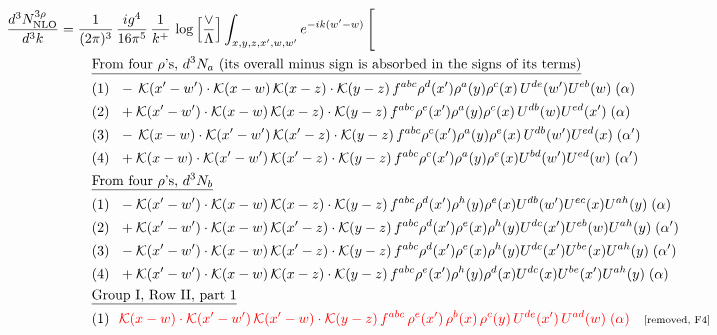 \documentclass[9pt]{article}
\begin{document}
\begin{align}
\frac{d^{3}N^{3\rho}_{\rm NLO}}{d^{3}k}={}&\frac{1}{(2\pi)^{3}}\,\frac{ig^{4}}{16\pi^{5}}\,\frac{1}{k^{+}}\,\log\Big[\frac{\vee}{\Lambda}\Big]\int_{x,y,z,x',w,w'}e^{-ik(w'-w)}\,\Bigg[\notag\\
&\quad\underline{\text{From four $\rho$'s, $d^3N_a$ (its overall minus sign is absorbed in the signs of its terms)}}\notag\\
&\quad\text{(1)}\ \ -\,\mathcal{K}(x'-w')\cdot \mathcal{K}(x-w)\, \mathcal{K}(x-z)\cdot \mathcal{K}(y-z)\, f^{a b c} \rho^{d}(x') \rho^{a}(y) \rho^{c}(x)\,U^{d e}(w') U^{e b}(w)\;(\alpha)\notag\\
&\quad\text{(2)}\ \ +\mathcal{K}(x'-w')\cdot \mathcal{K}(x-w)\, \mathcal{K}(x-z)\cdot \mathcal{K}(y-z)\, f^{a b c} \rho^{e}(x') \rho^{a}(y) \rho^{c}(x)\, U^{d b}(w) U^{e d}(x')\;(\alpha)\notag\\
&\quad\text{(3)}\ \ -\,\mathcal{K}(x-w)\cdot \mathcal{K}(x'-w')\, \mathcal{K}(x'-z)\cdot \mathcal{K}(y-z)\, f^{a b c} \rho^{c}(x') \rho^{a}(y) \rho^{e}(x)\,U^{d b}(w') U^{e d}(x)\;(\alpha')\notag\\
&\quad\text{(4)}\ \ +\mathcal{K}(x-w)\cdot \mathcal{K}(x'-w')\, \mathcal{K}(x'-z)\cdot \mathcal{K}(y-z)\, f^{a b c} \rho^{c}(x') \rho^{a}(y) \rho^{e}(x) U^{b d}(w') U^{e d}(w)\;(\alpha')\notag\\
&\quad\underline{\text{From four $\rho$'s, $d^3N_b$}}\notag\\
&\quad\text{(1)}\ \ - \mathcal{K}(x'-w')\cdot \mathcal{K}(x-w)\, \mathcal{K}(x-z)\cdot \mathcal{K}(y-z)\, f^{a b c} \rho^{d}(x') \rho^{h}(y) \rho^{e}(x) U^{d b}(w') U^{e c}(x) U^{a h}(y)\;(\alpha)\notag\\
&\quad\text{(2)}\ \ + \mathcal{K}(x'-w')\cdot \mathcal{K}(x-w)\,\mathcal{K}(x'-z)\cdot \mathcal{K}(y-z)\, f^{a b c} \rho^{d}(x') \rho^{e}(x) \rho^{h}(y) U^{d c}(x') U^{e b}(w) U^{a h}(y)\;(\alpha')\notag\\
&\quad\text{(3)}\ \ - \mathcal{K}(x'-w')\cdot \mathcal{K}(x-w)\,\mathcal{K}(x'-z)\cdot \mathcal{K}(y-z)\, f^{a b c} \rho^{d}(x') \rho^{e}(x) \rho^{h}(y) U^{d c}(x') U^{b e}(x) U^{a h}(y)\;(\alpha')\notag\\
&\quad\text{(4)}\ \ +  \mathcal{K}(x'-w')\cdot \mathcal{K}(x-w)\, \mathcal{K}(x-z)\cdot \mathcal{K}(y-z)\, f^{a b c} \rho^{e}(x') \rho^{h}(y) \rho^{d}(x) U^{d c}(x) U^{b e}(x') U^{a h}(y)\;(\alpha)\notag\\
&\quad\underline{\text{Group I, Row II, part 1}}\notag\\
&\quad\text{(1)}\ \ \textcolor{red}{\mathcal{K}(x-w)\cdot \mathcal{K}(x'-w')\, \mathcal{K}(x'-w)\cdot \mathcal{K}(y-z)\, f^{abc}\, \rho^{e}(x')\,\rho^{b}(x)\,\rho^{c}(y)\,U^{de}(x')\,U^{ad}(w)\;(\alpha)}\quad\text{\scriptsize[removed, F4]}\notag\\

\end{align}
\end{document}
